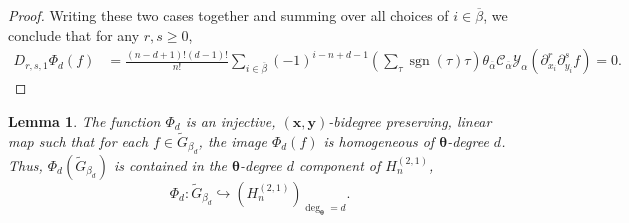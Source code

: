 \documentclass[11pt, noadjust, reqno]{amsart}
\newtheorem{lemma}[theorem]{Lemma}
\theoremstyle{definition}
\theoremstyle{remark}
\numberwithin{equation}{section}
\newcommand{\0}{\emptyset}
\newcommand{\cC}{\mathcal{C}}
\newcommand{\cY}{\mathcal{Y}}
\DeclareMathOperator{\sgn}{sgn}
\begin{document}
\begin{proof}
    Writing these two cases together 
    and summing over all choices of $i \in \overline{\beta}$, we conclude that for any $r,s\geq 0$,
    \begin{align*}
        D_{r,s,1} \Phi_d
        (f) &= \frac{(n-d+1)!(d-1)!}{n!}\sum_{i\in {\overline{\beta}}}
        (-1)^{i-n+d-1}
        \left( \sum_\tau \sgn(\tau) \tau \right) \theta_{\overline{\alpha}} \cC_{\overline{\alpha}} \cY_\alpha (\partial_{x_i}^r \partial_{y_i}^s f) = 0.
    \end{align*}
\end{proof}

\begin{lemma}\label{lem:injectivity}
    The function $\Phi_d$ is an injective, $(\bm{x},\bm{y})$-bidegree preserving, linear map such that for each $f \in  \widetilde{G}_{\beta_d}$, the image $\Phi_d(f)$ is homogeneous of $\bm{\theta}$-degree $d$. Thus, $\Phi_d(\widetilde{G}_{\beta_d})$ is contained in the $\bm{\theta}$-degree $d$ component of $H_n^{(2,1)}$, 
    \[
\Phi_d: \widetilde{G}_{\beta_d} \hookrightarrow  \left(H_n^{(2,1)}\right)_{\deg_{\bm{\theta}} = d}.
    \]
\end{lemma}
\end{document}
